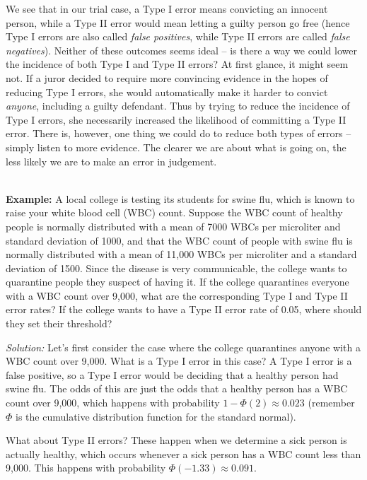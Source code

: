 We see that in our trial case, a Type I error means convicting an innocent person, while a Type II error would mean letting a guilty person go free (hence Type I errors are also called \emph{false positives}, while Type II errors are called \emph{false negatives}).  Neither of these outcomes seems ideal -- is there a way we could lower the incidence of both Type I and Type II errors?  At first glance, it might seem not.  If a juror decided to require more convincing evidence in the hopes of reducing Type I errors, she would automatically make it harder to convict \emph{anyone}, including a guilty defendant.  Thus by trying to reduce the incidence of Type I errors, she necessarily increased the likelihood of committing a Type II error.  There is, however, one thing we could do to reduce both types of errors -- simply listen to more evidence.  The clearer we are about what is going on, the less likely we are to make an error in judgement.

\ \\

\textbf{Example:}  \ex A local college is testing its students for swine flu, which is known to raise your white blood cell (WBC) count.  Suppose the WBC count of healthy people is normally distributed with a mean of 7000 WBCs per microliter and standard deviation of 1000, and that the WBC count of people with swine flu is normally distributed with a mean of 11,000 WBCs per microliter and a standard deviation of 1500. Since the disease is very communicable, the college wants to quarantine people they suspect of having it.  If the college quarantines everyone with a WBC count over 9,000, what are the corresponding Type I and Type II error rates?  If the college wants to have a Type II error rate of 0.05, where should they set their threshold?


\emph{Solution:} Let's first consider the case where the college quarantines anyone with a WBC count over 9,000.  What is a Type I error in this case?  A Type I error is a false positive, so a Type I error would be deciding that a healthy person had swine flu.  The odds of this are just the odds that a healthy person has a WBC count over 9,000, which happens with probability $1-\Phi(2)\approx 0.023$ (remember $\Phi$ is the cumulative distribution function for the standard normal).

What about Type II errors?  These happen when we determine a sick person is actually healthy, which occurs whenever a sick person has a WBC count less than 9,000.  This happens with probability $\Phi(-1.33)\approx 0.091$.

